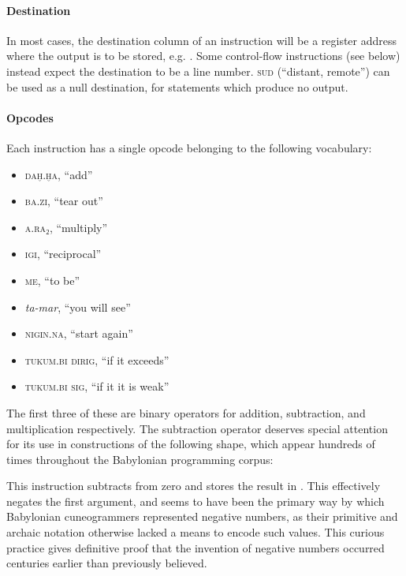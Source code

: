 \documentclass[11pt]{article}
\begin{document}
\paragraph{Destination}
In most cases, the destination column of an instruction will be a register address where the output is to be stored, e.g. . 
Some control-flow instructions (see below) instead expect the destination to be a line number. 
 \textsc{sud} (``distant, remote'') can be used as a null destination, for statements which produce no output.

\paragraph{Opcodes}
Each instruction has a single opcode belonging to the following vocabulary:
\begin{itemize}
    \item {} \textsc{daḫ.ḫa}, ``add''
    \item {} \textsc{ba.zi}, ``tear out''
    \item {} \textsc{a.ra₂}, ``multiply''
    \item {} \textsc{igi}, ``reciprocal''
    \item {} \textsc{me}, ``to be''
    \item {} \textit{ta-mar}, ``you will see''
    \item {} \textsc{nigin.na}, ``start again''
    \item {} \textsc{tukum.bi dirig}, ``if it exceeds''
    \item {}  \textsc{tukum.bi sig}, ``if it it is weak''
\end{itemize}

The first three of these are binary operators for addition, subtraction, and multiplication respectively. 
The subtraction operator deserves special attention for its use in constructions of the following shape, which appear hundreds of times throughout the Babylonian programming corpus:

\begin{center}
    \qquad{}\qquad{}\qquad{}
\end{center}

This instruction subtracts  from zero and stores the result in . 
This effectively negates the first argument, and seems to have been the primary way by which Babylonian cuneogrammers represented negative numbers, as their primitive and archaic notation otherwise lacked a means to encode such values.
This curious practice gives definitive proof that the invention of negative numbers occurred centuries earlier than previously believed.
\end{document}

